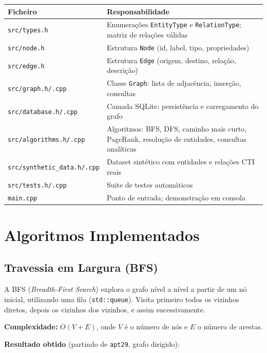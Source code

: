 \documentclass[12pt,a4paper]{article}
\begin{document}
\begin{center}
\begin{tabular}{lp{9cm}}
\toprule
\textbf{Ficheiro} & \textbf{Responsabilidade} \\
\midrule
\texttt{src/types.h}           & Enumerações \texttt{EntityType} e \texttt{RelationType}; matriz de relações válidas \\
\texttt{src/node.h}            & Estrutura \texttt{Node} (id, label, tipo, propriedades) \\
\texttt{src/edge.h}            & Estrutura \texttt{Edge} (origem, destino, relação, descrição) \\
\texttt{src/graph.h/.cpp}      & Classe \texttt{Graph}: lista de adjacência, inserção, consultas \\
\texttt{src/database.h/.cpp}   & Camada SQLite: persistência e carregamento do grafo \\
\texttt{src/algorithms.h/.cpp} & Algoritmos: BFS, DFS, caminho mais curto, PageRank, resolução de entidades, consultas analíticas \\
\texttt{src/synthetic\_data.h/.cpp} & Dataset sintético com entidades e relações CTI reais \\
\texttt{src/tests.h/.cpp}      & Suite de testes automáticos \\
\texttt{main.cpp}              & Ponto de entrada; demonstração em consola \\
\bottomrule
\end{tabular}
\end{center}

\section{Algoritmos Implementados}

\subsection{Travessia em Largura (BFS)}

A BFS (\emph{Breadth-First Search}) explora o grafo nível a nível a partir de um nó inicial, utilizando uma fila (\texttt{std::queue}). Visita primeiro todos os vizinhos diretos, depois os vizinhos dos vizinhos, e assim sucessivamente.

\medskip
\noindent\textbf{Complexidade:} $O(V + E)$, onde $V$ é o número de nós e $E$ o número de arestas.

\medskip
\noindent\textbf{Resultado obtido} (partindo de \texttt{apt29}, grafo dirigido):
\end{document}
